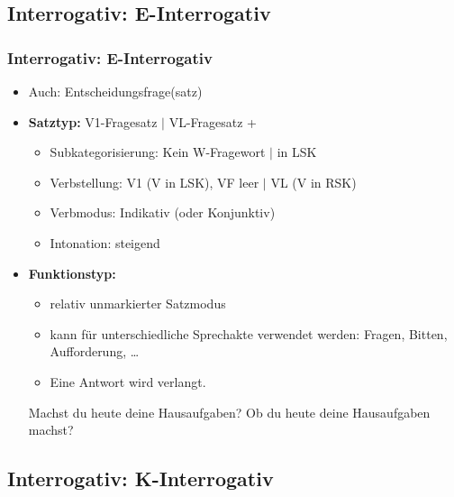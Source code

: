 \subsection{Interrogativ: E-Interrogativ}


\begin{frame}
\frametitle{Interrogativ: E-Interrogativ}

\begin{itemize}
	\item Auch: Entscheidungsfrage(satz)
	\item \textbf{Satztyp:} V1-Fragesatz $|$ VL-Fragesatz + 
	\begin{itemize}
		\item Subkategorisierung: Kein W-Fragewort $|$  in LSK
		\item Verbstellung: V1 (V in LSK), VF leer $|$  VL (V in RSK)
		\item Verbmodus: Indikativ (oder Konjunktiv)
		\item Intonation: steigend
	\end{itemize}
	\item \textbf{Funktionstyp:}
	\begin{itemize}
		\item relativ unmarkierter Satzmodus
		\item kann für unterschiedliche Sprechakte verwendet werden: Fragen, Bitten, Aufforderung, \dots
		\item Eine Antwort wird verlangt.
	\end{itemize}
	
	\eal
	\ex Machst du heute deine Hausaufgaben?
	\ex Ob du heute deine Hausaufgaben machst?
	\zl
	
\end{itemize}

\end{frame}


\subsection{Interrogativ: K-Interrogativ}


